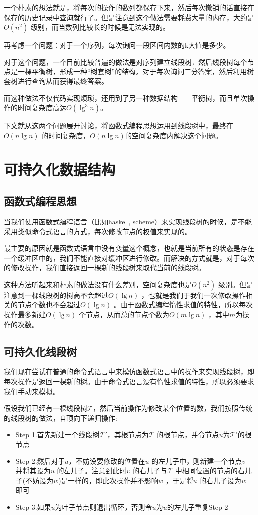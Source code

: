 \documentclass[a4paper]{article}
\renewcommand{\T}{\mathcal{T}}
\begin{document}
一个朴素的想法就是，将每次的操作的数列都保存下来，然后每次撤销的话直接在保存的历史记录中查询就行了。但是注意到这个做法需要耗费大量的内存，大约是$O(n^2)$ 级别，而当数列比较长的时候是无法实现的。

再考虑一个问题：对于一个序列，每次询问一段区间内数的k大值是多少。

对于这个问题，一个目前比较普遍的做法是对序列建立线段树，然后线段树每个节点是一棵平衡树，形成一种“树套树”的结构。对于每次询问二分答案，然后利用树套树进行查询从而获得最终答案。

而这种做法不仅代码实现烦琐，还用到了另一种数据结构——平衡树，而且单次操作的时间复杂度高达$O(\lg^3 n)$。

下文就从这两个问题展开讨论，将函数式编程思想运用到线段树中，最终在$O(n\lg n)$ 的时间复杂度，$O(n\lg n)$的空间复杂度内解决这个问题。

\section{可持久化数据结构}
\subsection{函数式编程思想}
当我们使用函数式编程语言（比如haskell, scheme）来实现线段树的时候，是不能采用类似命令式语言的方式，每次修改节点的权值来实现的。

最主要的原因就是函数式语言中没有变量这个概念，也就是当前所有的状态是存在一个缓冲区中的，我们不能直接对缓冲区进行修改。而解决的方式就是，对于每次的修改操作，我们直接返回一棵新的线段树来取代当前的线段树。

这种方法听起来和朴素的做法没有什么差别，空间复杂度也是$O(n^2)$ 级别。但是注意到一棵线段树的树高不会超过$O(\lg n)$ ，也就是我们于我们一次修改操作相关的节点个数也不会超过$O(\lg n)$ 。由于函数式编程惰性求值的特性，所以每次操作最多新建$O(\lg n)$ 个节点，从而总的节点个数为$O(m\lg n)$ ，其中$m$为操作的次数。

\subsection{可持久化线段树}
我们现在尝试在普通的命令式语言中来模仿函数式语言中的操作来实现线段树，即每次操作是返回一棵新的树。由于命令式语言没有惰性求值的特性，所以必须要求我们手动来模拟。

假设我们已经有一棵线段树$\T$，然后当前操作为修改某个位置的数，我们按照传统的线段树的做法，自顶向下递归操作:
\begin{itemize}
	\item{Step 1.}首先新建一个线段树$\T'$，其根节点为$\T$ 的根节点，并令节点$u$为$\T'$的根节点
	
	\item{Step 2.}然后对于$u$，不妨设要修改的位置在$u$ 的左儿子中，则新建一个节点$v$ 并将其设为$u$ 的左儿子。注意到此时$u$ 的右儿子与$\T$ 中相同位置的节点的右儿子(不妨设为$w$)是一样的，即此次操作并不影响$w$ ，于是将$u$ 的右儿子设为$w$ 即可

	\item{Step 3.}如果$u$为叶子节点则退出循环，否则令$u$为$u$的左儿子重复Step 2
\end{itemize}
\end{document}
